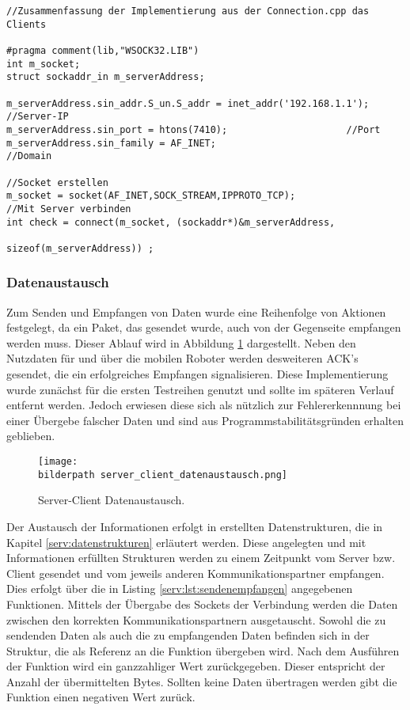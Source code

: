 \begin{lstlisting}[frame=tb,captionpos=b,caption=Socket Connection - Client., label=serv:lst:clientconn]
//Zusammenfassung der Implementierung aus der Connection.cpp das Clients

#pragma comment(lib,"WSOCK32.LIB")
int m_socket;
struct sockaddr_in m_serverAddress;

m_serverAddress.sin_addr.S_un.S_addr = inet_addr('192.168.1.1');	//Server-IP
m_serverAddress.sin_port = htons(7410);						//Port
m_serverAddress.sin_family = AF_INET;							//Domain	

//Socket erstellen
m_socket = socket(AF_INET,SOCK_STREAM,IPPROTO_TCP);
//Mit Server verbinden
int check = connect(m_socket, (sockaddr*)&m_serverAddress,
													sizeof(m_serverAddress)) ;
\end{lstlisting}

\subsubsection{Datenaustausch}
Zum Senden und Empfangen von Daten wurde eine Reihenfolge von Aktionen festgelegt, da ein Paket, das gesendet wurde, auch von der Gegenseite empfangen werden muss. Dieser Ablauf wird in Abbildung \ref{serv:fig:datenaustausch} dargestellt. Neben den Nutzdaten für und über die mobilen Roboter werden desweiteren ACK's gesendet, die ein erfolgreiches Empfangen signalisieren. Diese Implementierung wurde zunächst für die ersten Testreihen genutzt und sollte im späteren Verlauf entfernt werden. Jedoch erwiesen diese sich als nützlich zur Fehlererkennnung bei einer Übergebe falscher Daten und sind aus Programmstabilitätsgründen erhalten geblieben.

\begin{figure}[h]
	\centering	
	\texttt{[image: \\bilderpath server\_client\_datenaustausch.png]}
	\caption{Server-Client Datenaustausch.}
	\label{serv:fig:datenaustausch}
\end{figure}

Der Austausch der Informationen erfolgt in erstellten Datenstrukturen, die in Kapitel \ref{serv:datenstrukturen} erläutert werden. Diese angelegten und mit Informationen erfüllten Strukturen werden zu einem Zeitpunkt vom Server bzw. Client gesendet und vom jeweils anderen Kommunikationspartner empfangen. Dies erfolgt über die in Listing \ref{serv:lst:sendenempfangen} angegebenen Funktionen. Mittels der Übergabe des Sockets der Verbindung werden die Daten zwischen den korrekten Kommunikationspartnern ausgetauscht. Sowohl die zu sendenden Daten als auch die zu empfangenden Daten befinden sich in der Struktur, die als Referenz an die Funktion übergeben wird. Nach dem Ausführen der Funktion wird ein ganzzahliger Wert zurückgegeben. Dieser entspricht der Anzahl der übermittelten Bytes. Sollten keine Daten übertragen werden gibt die Funktion einen negativen Wert zurück.

